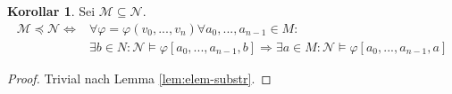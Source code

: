\documentclass{article}
\theoremstyle{definition}
\newtheorem{kor}[dfn]{Korollar}
\theoremstyle{plain}
\newcommand{\m}[1]{\mathcal{#1}}
\begin{document}
    \begin{kor}
    \label{kor:elem-substr}
        Sei $ \m{M} \subseteq \m{N} $.
        \begin{align*}
            \m{M} \preceq \m{N} \Leftrightarrow & \forall \varphi = \varphi(v_0, ..., v_n) \forall a_0, ..., a_{n - 1} \in M: \\
            & \exists b \in N: \m{N} \models \varphi[a_0, ..., a_{n - 1}, b] \Rightarrow \exists a \in M: \m{N} \models \varphi[a_0, ..., a_{n - 1}, a]
        \end{align*}
    \end{kor}

    \begin{proof}
        Trivial nach Lemma \ref{lem:elem-substr}.
    \end{proof}
\end{document}
